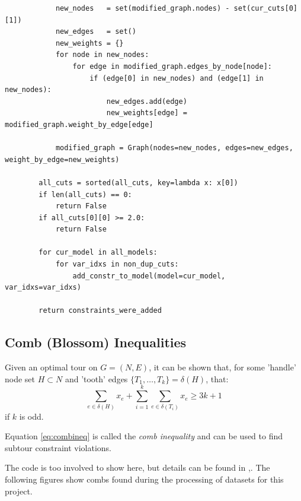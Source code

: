 \documentclass{article}
\begin{document}
\begin{flushleft}
\begin{flushleft}
\begin{flushleft}
\begin{lstlisting}
            new_nodes   = set(modified_graph.nodes) - set(cur_cuts[0][1])
            new_edges   = set()
            new_weights = {}
            for node in new_nodes:
                for edge in modified_graph.edges_by_node[node]:
                    if (edge[0] in new_nodes) and (edge[1] in new_nodes):
                        new_edges.add(edge)
                        new_weights[edge] = modified_graph.weight_by_edge[edge]

            modified_graph = Graph(nodes=new_nodes, edges=new_edges, weight_by_edge=new_weights)

        all_cuts = sorted(all_cuts, key=lambda x: x[0])
        if len(all_cuts) == 0:
            return False
        if all_cuts[0][0] >= 2.0:
            return False

        for cur_model in all_models:
            for var_idxs in non_dup_cuts:
                add_constr_to_model(model=cur_model, var_idxs=var_idxs)

        return constraints_were_added
\end{lstlisting}

\end{flushleft}

\end{flushleft}

\subsection{Comb (Blossom) Inequalities}
\begin{flushleft}

Given an optimal tour on $G = (N,E)$,
it can be shown that,
for some 'handle' node set $H \subset N$
and 'tooth' edges $\{ T_1,\ldots,T_k \} = \delta(H)$,
that:
\begin{equation} \label{eq:combineq}
  \sum_{e \in \delta(H)}{x_e} + \sum_{i = 1}^{k}{ \sum_{e \in \delta(T_i)}{x_e} } \geq 3k + 1
\end{equation}
if $k$ is odd.

Equation \eqref{eq:combineq} is called the \textit{comb inequality}
and can be used to find subtour constraint violations.

The code is too involved to show here,
but details can be found in \cite{tspproblem},\cite{ico}.
The following figures show combs found
during the processing of datasets
for this project.


\end{flushleft}
\end{flushleft}
\end{document}
